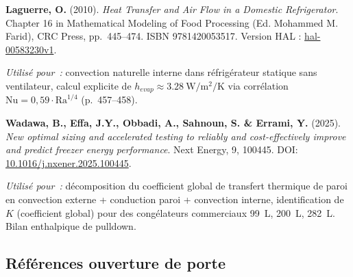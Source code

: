 \documentclass[11pt,a4paper]{article}
\begin{document}
\begin{enumerate}[label={[\arabic*]},itemsep=4pt,start=3]

\item \label{laguerre2010}
\textbf{Laguerre, O.} (2010). \emph{Heat Transfer and Air Flow in a Domestic Refrigerator}.
Chapter 16 in Mathematical Modeling of Food Processing (Ed. Mohammed M. Farid), CRC Press,
pp.~445--474. ISBN 9781420053517. Version HAL : \href{https://hal.science/hal-00583230v1}
{hal-00583230v1}.

\textit{Utilisé pour~:} convection naturelle interne dans réfrigérateur statique sans
ventilateur, calcul explicite de $h_{evap} \approx \SI{3,28}{\watt\per\meter\squared\per
\kelvin}$ via corrélation $\mathrm{Nu} = 0{,}59 \cdot \mathrm{Ra}^{1/4}$ (p.~457--458).

\medskip
\item \label{wadawa2025}
\textbf{Wadawa, B., Effa, J.Y., Obbadi, A., Sahnoun, S. \& Errami, Y.} (2025). \emph{New
optimal sizing and accelerated testing to reliably and cost-effectively improve and
predict freezer energy performance}. Next Energy, 9, 100445. DOI:
\href{https://doi.org/10.1016/j.nxener.2025.100445}{10.1016/j.nxener.2025.100445}.

\textit{Utilisé pour~:} décomposition du coefficient global de transfert thermique de
paroi en convection externe + conduction paroi + convection interne, identification de $K$
(coefficient global) pour des congélateurs commerciaux 99~L, 200~L, 282~L. Bilan
enthalpique de pulldown.

\end{enumerate}

\subsection*{Références ouverture de porte}
\end{document}
